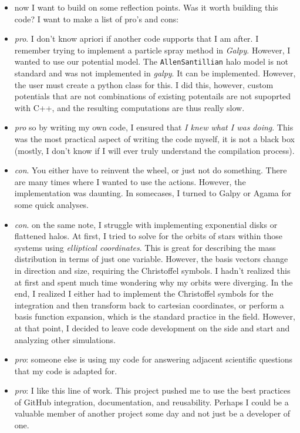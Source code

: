 \documentclass{article}
\begin{document}
    \begin{itemize}
        \item now I want to build on some reflection points. Was it worth building this code? I want to make a list of pro's and cons: 
        \item \textit{pro}. I don't know apriori if another code supports that I am after. I remember trying to implement a particle spray method in \textit{Galpy}. However, I wanted to use our potential model. The \texttt{AllenSantillian} halo model is not standard and was not implemented in \textit{galpy}. It can be implemented. However, the user must create a python class for this. I did this, however, custom potentials that are not combinations of existing potentails are not supoprted with C++, and the resulting computations are thus really slow. 
        \item \textit{pro} so by writing my own code, I ensured that \textit{I knew what I was doing}. This was the most practical aspect of writing the code myself, it is not a black box (mostly, I don't know if I will ever truly understand the compilation process).
        \item \textit{con}. You either have to reinvent the wheel, or just not do something. There are many times where I wanted to use the actions. However, the implementation was daunting. In somecases, I turned to Galpy or Agama for some quick analyses. 
        \item \textit{con}. on the same note, I struggle with implementing exponential disks or flattened halos. At first, I tried to solve for the orbits of stars within those systems using \textit{elliptical coordinates}. This is great for describing the mass distribution in terms of just one variable. However, the basis vectors change in direction and size, requiring the Christoffel symbols. I hadn't realized this at first and spent much time wondering why my orbits were diverging. In the end, I realized I either had to implement the Christoffel symbols for the integration and then transform back to cartesian coordinates, or perform a basis function expansion, which is the standard practice in the field. However, at that point, I decided to leave code development on the side and start and analyzing other simulations. 
        \item \textit{pro}: someone else is using my code for answering adjacent scientific questions that my code is adapted for. 
        \item \textit{pro}: I like this line of work. This project pushed me to use the best practices of GitHub integration, documentation, and reusability. Perhaps I could be a valuable member of another project some day and not just be a developer of one.         
    \end{itemize}    



\end{document}

